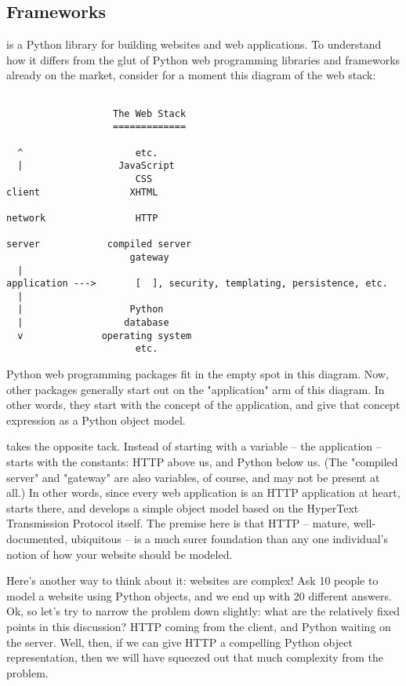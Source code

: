 \subsection{Frameworks \label{frameworks}}

 is a Python library for building websites and web applications.
To understand how it differs from the glut of Python web programming libraries
and frameworks already on the market, consider for a moment this diagram of the
web stack:

\begin{verbatim}

                   The Web Stack
                   =============

  ^                    etc.
  |                 JavaScript
                       CSS
client                XHTML

network                HTTP

server            compiled server
                      gateway
  |
application --->       [  ], security, templating, persistence, etc.
  |
  |                   Python
  |                  database
  v              operating system
                       etc.

\end{verbatim}

Python web programming packages fit in the empty spot in this diagram. Now,
other packages generally start out on the "application" arm of this diagram. In
other words, they start with the concept of the \b{application}, and give that
concept expression as a Python object model.

 takes the opposite tack. Instead of starting with a variable --
the application --  starts with the constants: HTTP above us, and
Python below us. (The "compiled server" and "gateway" are also variables, of
course, and may not be present at all.) In other words, since every web
application is an HTTP application at heart,  starts there, and
develops a simple object model based on the HyperText Transmission Protocol
itself. The premise here is that HTTP -- mature, well-documented, ubiquitous --
is a much surer foundation than any one individual's notion of how your website
should be modeled.

Here's another way to think about it: websites are complex! Ask 10 people to
model a website using Python objects, and we end up with 20 different answers.
Ok, so let's try to narrow the problem down slightly: what are the relatively
fixed points in this discussion? HTTP coming from the client, and Python waiting
on the server. Well, then, if we can give HTTP a compelling Python object
representation, then we will have squeezed out that much complexity from the
problem.


